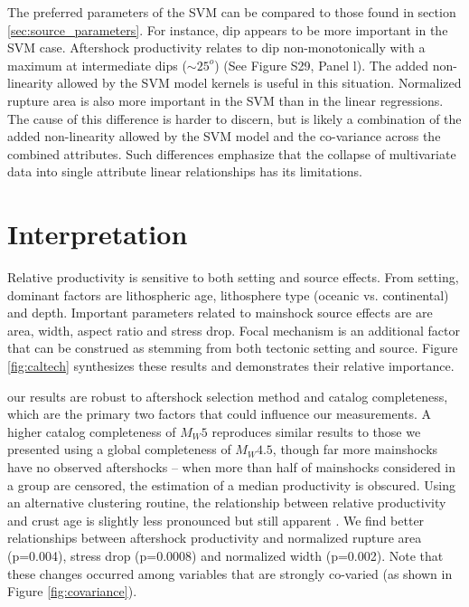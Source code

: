 \documentclass[draft, jgrga]{agujournal2018}
\begin{document}
The preferred parameters of the SVM can be compared to those found in section \ref{sec:source_parameters}. For instance, dip appears to be more important in the SVM case. Aftershock productivity relates to dip non-monotonically with a maximum at intermediate  dips ($\sim 25^o$) (See Figure S29, Panel l). The added non-linearity allowed by the SVM model kernels is useful in this situation. Normalized rupture area is also more important in the SVM than in the linear regressions. The cause of this difference is harder to discern, but is likely a combination of the added non-linearity allowed by the SVM model and the co-variance across the combined attributes. Such differences emphasize that the collapse of multivariate data into single attribute linear relationships has its limitations.

\section{Interpretation}
    
Relative productivity is sensitive to both setting and source effects. From setting, dominant factors are lithospheric age, lithosphere type (oceanic vs. continental) and depth. Important parameters related to mainshock source effects are are area, width, aspect ratio and stress drop. Focal mechanism is an additional factor that can be construed as stemming from both tectonic setting and source. Figure \ref{fig:caltech}  synthesizes these results and demonstrates their relative importance. 

 our results are robust to aftershock selection method and catalog completeness, which are the primary two factors that could influence our measurements. A higher catalog completeness of $M_W5$ reproduces similar results to those we presented using a global completeness of $M_W4.5$, though far more mainshocks have no observed aftershocks  -- when more than half of mainshocks considered in a group are censored, the estimation of a median productivity is obscured. Using an alternative clustering routine, the relationship between relative productivity and crust age is slightly less pronounced but still apparent . We find better relationships between aftershock productivity and normalized rupture area (p=0.004), stress drop (p=0.0008) and normalized width (p=0.002). Note that these changes occurred among variables that are strongly co-varied (as shown in Figure \ref{fig:covariance}). 
\end{document}
